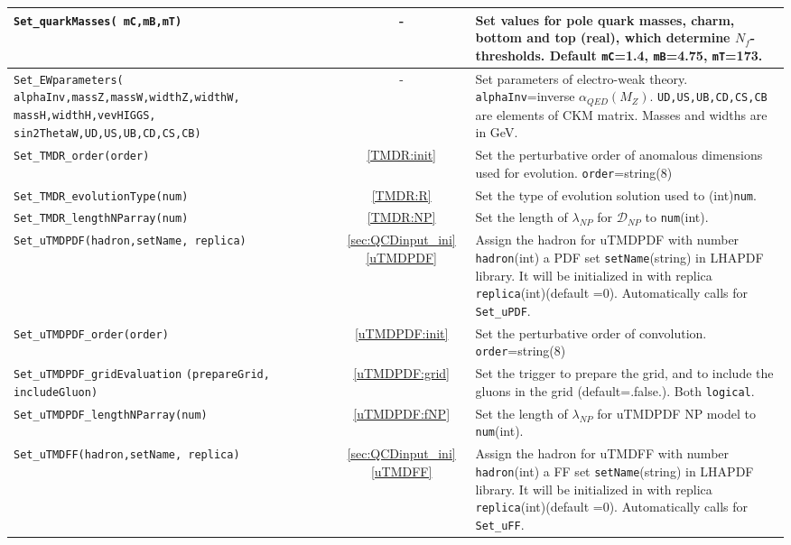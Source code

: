 \documentclass[prd,nofootinbib,eqsecnum,final]{revtex4}
\renewcommand{\(}{\left(}
\renewcommand{\)}{\right)}
\renewcommand{\[}{\left[}
\renewcommand{\]}{\right]}
\newcommand{\blue}[1]{{\color{blue} #1}}
\begin{document}
\begin{center}
\begin{longtable}{||p{7cm}|c|p{10cm}||}
\\\hline
\texttt{Set\_quarkMasses(\blue{mC,mB,mT})} & - & Set values for pole quark masses, charm, bottom and top (real), which determine $N_f$-thresholds. Default \texttt{mC}=1.4, \texttt{mB}=4.75, \texttt{mT}=173.
\\\hline \texttt{Set\_EWparameters(}\texttt{
\blue{alphaInv,massZ,massW,widthZ,widthW,}} \texttt{\blue{massH,widthH,vevHIGGS,}} \texttt{\blue{sin2ThetaW,UD,US,UB,CD,CS,CB)}} & - & Set parameters of electro-weak theory. \texttt{alphaInv}=inverse $\alpha_{QED}(M_Z)$. \texttt{UD,US,UB,CD,CS,CB} are elements of CKM matrix. Masses and widths are in GeV.
\\\hline\hline
\texttt{Set\_TMDR\_order(order)} & \ref{TMDR:init} & Set the perturbative order of anomalous dimensions used for evolution. \texttt{order}=string(8)
\\\hline
\texttt{Set\_TMDR\_evolutionType(num)} & \ref{TMDR:R} & Set the type of evolution solution used to (int)\texttt{num}.
\\\hline
\texttt{Set\_TMDR\_lengthNParray(num)} & \ref{TMDR:NP} & Set the length of $\lambda_{NP}$ for $\mathcal{D}_{NP}$ to \texttt{num}(int).
\\\hline\hline
\texttt{Set\_uTMDPDF(hadron,setName,\blue{replica}) } & \ref{sec:QCDinput_ini} \ref{uTMDPDF} & Assign the hadron for uTMDPDF with number \texttt{hadron}(int) a PDF set \texttt{setName}(string) in LHAPDF library. It will be initialized in with replica \texttt{replica}(int)(default =0). Automatically calls for \texttt{Set\_uPDF}.
\\\hline
\texttt{Set\_uTMDPDF\_order(order)} &\ref{uTMDPDF:init} & Set the perturbative order of convolution. \texttt{order}=string(8)
\\\hline
\texttt{Set\_uTMDPDF\_gridEvaluation} \texttt{(prepareGrid,\blue{includeGluon})} & \ref{uTMDPDF:grid} & Set the trigger to prepare the grid, and to include the gluons in the grid (default=.false.). Both \texttt{logical}.
\\\hline
\texttt{Set\_uTMDPDF\_lengthNParray(num)} & \ref{uTMDPDF:fNP} & Set the length of $\lambda_{NP}$ for uTMDPDF NP model to \texttt{num}(int).
\\\hline\hline
\texttt{Set\_uTMDFF(hadron,setName,\blue{replica}) } & \ref{sec:QCDinput_ini} \ref{uTMDFF}& Assign the hadron for uTMDFF with number \texttt{hadron}(int) a FF set \texttt{setName}(string) in LHAPDF library. It will be initialized in with replica \texttt{replica}(int)(default =0). Automatically calls for \texttt{Set\_uFF}.

\end{longtable}
\end{center}
\end{document}
